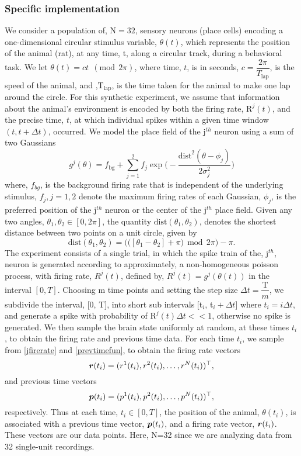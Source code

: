 \subsubsection{Specific implementation}
We consider a population of, N$=32$, sensory neurons (place cells) encoding a 
one-dimensional circular stimulus variable, $\theta(t)$, which represents 
the position of the animal (rat), at any time, t, along a circular track, during
a behavioral task.
We let $\theta(t) = c t \ \ (\text{mod} \ \ 2\pi)$, where time, $t$, is in seconds,
$c = \dfrac{2\pi}{T_{\text{lap}}}$, is the speed of the animal, and
,$\text{T}_{\text{lap}}$, is the time taken for the animal to make one lap around the circle.
For this synthetic experiment, we assume that information about the animal's
environment is encoded by both the firing rate, $\text{R}^{j}(t)$,
and the precise time, $t$, at which individual spikes within a given time window
$(t, t+\Delta t)$, occurred.
We model the place field of the j$^{th}$ neuron using a sum of two Gaussians
\begin{equation}
{g}^{j}(\theta) = \displaystyle  f_{\text{bg}} + \sum_{j=1}^{2} f_{j} 
\exp\bigg(-\dfrac{\text{dist}^{2}(\theta - \phi_{j})}{2\sigma_{j}^{2}} \bigg)
\end{equation}
where, $f_{bg}$, is the background firing rate that is independent of the underlying stimulus, $f_{j}, j=1,2$ denote the maximum firing rates of each 
Gaussian,  $\phi_{j}$, is the preferred position of the j$^{th}$ 
neuron or the center of the j$^{th}$ place field.
Given any two angles, $\theta_{1}, \theta_{2} \in [0, 2\pi]$, the quantity
$\text{dist}(\theta_{1}, \theta_{2})$, denotes the shortest distance between 
two points on a unit circle, given by
\[
\text{dist}(\theta_{1}, \theta_{2}) = \big( \big( [\theta_{1} - \theta_{2}] + \pi  \big) \ \ \text{mod} \ \ 2\pi \big) - \pi.
\]
The experiment consists of a single trial, in which the spike train of the, j$^{th}$, neuron is generated according to approximately, a non-homogeneous poisson process, with firing rate, $R^{j}(t)$, defined by, $R^{j}(t) = g^{j}(\theta(t))$ in the interval $[0, T]$. Choosing m time points and setting the step size $\Delta t = \dfrac{\text{T}}{m}$, we subdivide the interval, [0, T], into short sub intervals [t$_{i}$, t$_{i} + \Delta t$] where $t_{i} = i \Delta t$, and generate
a spike with probability of $\text{R}^{j}(t)\Delta t << 1$, otherwise no spike is generated.  We then sample the brain state uniformly at random, at these times $t_{i}$, to obtain the firing rate and previous time data. For each time $t_{i}$, we sample from  \eqref{jfirerate} and  \eqref{prevtimefun}, to obtain the firing rate vectors 
\[ \boldsymbol{r}(t_{i}) = (r^{1}(t_{i}), r^{2}(t_{i}), \ldots, r^{N}(t_{i}))^{\top},
\]
and previous time vectors
\[
\boldsymbol{p}(t_{i}) = (p^{1}(t_{i}), p^{2}(t_{i}), \ldots, p^{N}(t_{i}))^{\top},
\] respectively.
Thus at each time, $t_{i} \in [0,T]$, the position of the animal, $\theta(t_{i})$, is associated with a previous time vector, $\boldsymbol{p}(t_{i})$,
and a firing rate vector, $\boldsymbol{r}(t_{i})$.
These vectors are our data points.  Here, N=32 since we are analyzing data from 32 single-unit recordings. 



